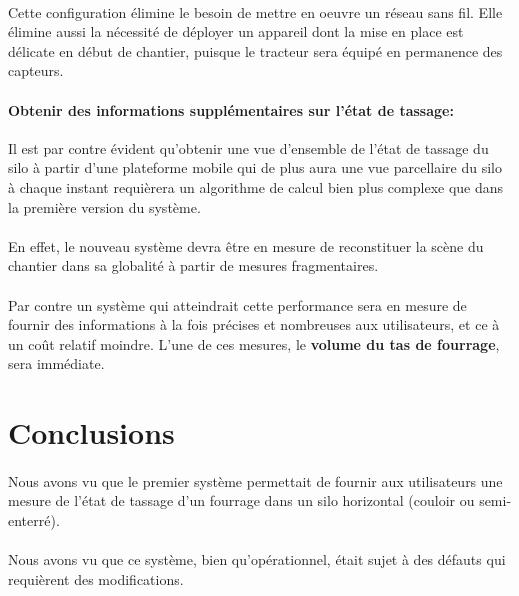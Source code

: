 \documentclass[12pt,a4paper]{report}
\begin{document}
\paragraph{} Cette configuration élimine le besoin de mettre en oeuvre un réseau sans fil. Elle élimine aussi la nécessité de déployer un appareil dont la mise en place est délicate en début de chantier, puisque le tracteur sera équipé en permanence des capteurs. 

\paragraph{Obtenir des informations supplémentaires sur l'état de tassage:} Il est par contre évident qu'obtenir une vue d'ensemble de l'état de tassage du silo à partir d'une plateforme mobile qui de plus aura une vue parcellaire du silo à chaque instant requièrera un algorithme de calcul bien plus complexe que dans la première version du système.

\paragraph{} En effet, le nouveau système devra être en mesure de reconstituer la scène du chantier dans sa globalité à partir de mesures fragmentaires.

\paragraph{} Par contre un système qui atteindrait cette performance sera en mesure de fournir des informations à la fois précises et nombreuses aux utilisateurs, et ce à un coût relatif moindre. L'une de ces mesures, le \textbf{volume du tas de fourrage}, sera immédiate.
\newpage

\section{Conclusions}

\paragraph{}Nous avons vu que le premier système permettait de fournir aux utilisateurs une mesure de l'état de tassage d'un fourrage dans un silo horizontal (couloir ou semi-enterré).

\paragraph{}Nous avons vu que ce système, bien qu'opérationnel, était sujet à des défauts qui requièrent des modifications.
\end{document}
